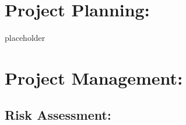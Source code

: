 \documentclass{article}
\begin{document}


 

\section{Project Planning: }

placeholder 

 

\section{ Project Management: }

\subsection{Risk Assessment: }
\end{document}
